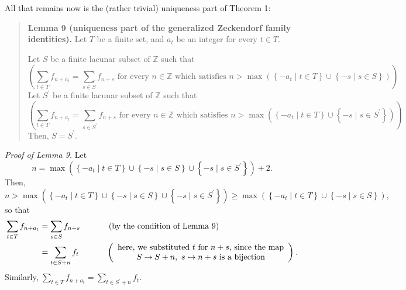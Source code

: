 \documentclass[12pt,final,notitlepage,onecolumn]{article}%
\begin{document}
All that remains now is the (rather trivial) uniqueness part of Theorem 1:

\begin{quote}
\textbf{Lemma 9 (uniqueness part of the generalized Zeckendorf family
identities).} Let $T$ be a finite set, and $a_{t}$ be an integer for every
$t\in T$.

Let $S$ be a finite lacunar subset of $\mathbb{Z}$ such that%
\[
\left(  \sum\limits_{t\in T}f_{n+a_{t}}=\sum\limits_{s\in S}f_{n+s}\text{ for
every }n\in\mathbb{Z}\text{ which satisfies }n>\max\left(  \left\{  -a_{t}\mid
t\in T\right\}  \cup\left\{  -s\mid s\in S\right\}  \right)  \right)  .
\]
Let $S^{\prime}$ be a finite lacunar subset of $\mathbb{Z}$ such that%
\[
\left(  \sum\limits_{t\in T}f_{n+a_{t}}=\sum\limits_{s\in S^{\prime}}%
f_{n+s}\text{ for every }n\in\mathbb{Z}\text{ which satisfies }n>\max\left(
\left\{  -a_{t}\mid t\in T\right\}  \cup\left\{  -s\mid s\in S^{\prime
}\right\}  \right)  \right)  .
\]
Then, $S=S^{\prime}$.
\end{quote}

\textit{Proof of Lemma 9.} Let%
\[
n=\max\left(  \left\{  -a_{t}\mid t\in T\right\}  \cup\left\{  -s\mid s\in
S\right\}  \cup\left\{  -s\mid s\in S^{\prime}\right\}  \right)  +2.
\]
Then,%
\[
n>\max\left(  \left\{  -a_{t}\mid t\in T\right\}  \cup\left\{  -s\mid s\in
S\right\}  \cup\left\{  -s\mid s\in S^{\prime}\right\}  \right)  \geq
\max\left(  \left\{  -a_{t}\mid t\in T\right\}  \cup\left\{  -s\mid s\in
S\right\}  \right)  ,
\]
so that%
\begin{align*}
\sum\limits_{t\in T}f_{n+a_{t}}  &  =\sum\limits_{s\in S}f_{n+s}%
\ \ \ \ \ \ \ \ \ \ \left(  \text{by the condition of Lemma 9}\right) \\
&  =\sum\limits_{t\in S+n}f_{t}\ \ \ \ \ \ \ \ \ \ \left(
\begin{array}
[c]{c}%
\text{here, we substituted }t\text{ for }n+s\text{, since the map}\\
S\rightarrow S+n,\ s\mapsto n+s\text{ is a bijection}%
\end{array}
\right)  .
\end{align*}
Similarly, $\sum\limits_{t\in T}f_{n+a_{t}}=\sum\limits_{t\in S^{\prime}%
+n}f_{t}$.
\end{document}
